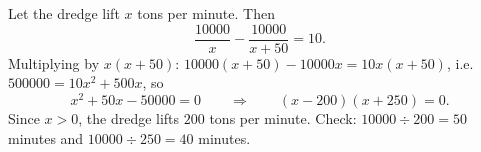 Let the dredge lift $x$ tons per minute. Then
\[
\dfrac{10000}{x}-\dfrac{10000}{x+50}=10 .
\]
Multiplying by $x(x+50)$: $10000(x+50)-10000x=10x(x+50)$, i.e.\ $500000=10x^2+500x$, so
\[
x^2+50x-50000=0\qquad\Longrightarrow\qquad (x-200)(x+250)=0 .
\]
Since $x>0$, the dredge lifts $\boxed{200}$ tons per minute. Check: $10000\div200=50$ minutes and $10000\div250=40$ minutes.
